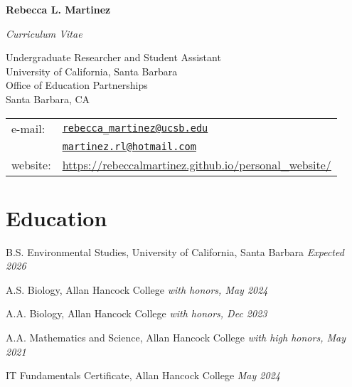 \documentclass[letterpaper]{article}
\def\name{Rebecca L. Martinez}
\renewenvironment{itemize}{
  \begin{list}{}{
    \setlength{\leftmargin}{1.5em}
  }
}{
  \end{list}
}
\begin{document}
\centerline{\huge \bf \name}
\begin{center}
  \emph{Curriculum Vitae}
\end{center}


\vspace{0.25in}

\begin{minipage}{0.55\linewidth}
Undergraduate Researcher and Student Assistant\\
University of California, Santa Barbara\\
Office of Education Partnerships\\
Santa Barbara, CA
\end{minipage}
\begin{minipage}{0.45\linewidth}
  \begin{tabular}{ll}
    e-mail: & \href{mailto:rebecca_martinez@ucsb.edu}{\tt rebecca\_martinez@ucsb.edu} \\
            & \href{mailto:martinez.rl@hotmail.com}{\tt martinez.rl@hotmail.com} \\
    website: & \href{https://rebeccalmartinez.github.io/personal_website/}{\url{https://rebeccalmartinez.github.io/personal_website/}}

  \end{tabular}
\end{minipage}


\section*{Education}


\begin{itemize}
  \item B.S. Environmental Studies, University of California, Santa Barbara  
  \emph{Expected 2026}

  \item A.S. Biology, Allan Hancock College  
  \emph{with honors, May 2024}

  \item A.A. Biology, Allan Hancock College  
  \emph{with honors, Dec 2023}

  \item A.A. Mathematics and Science, Allan Hancock College  
  \emph{with high honors, May 2021}

  \item IT Fundamentals Certificate, Allan Hancock College  
  \emph{May 2024}
\end{itemize}
\end{document}
